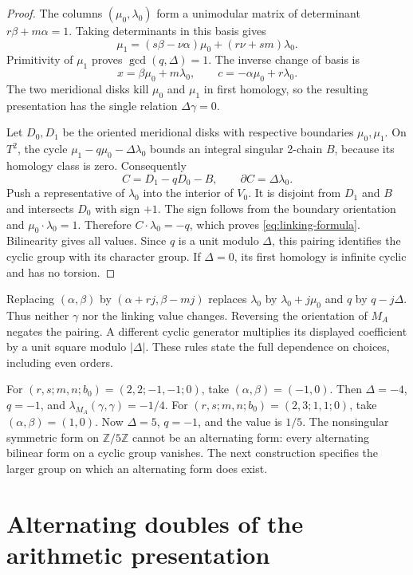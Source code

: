 \documentclass[11pt]{article}
\numberwithin{equation}{section}
\begin{document}
\begin{proof}
The columns $(\mu_0,\lambda_0)$ form a unimodular matrix of determinant
$r\beta+m\alpha=1$.  Taking determinants in this basis gives
\[
 \mu_1=(s\beta-\nu\alpha)\mu_0+(r\nu+sm)\lambda_0.
\]
Primitivity of $\mu_1$ proves $\gcd(q,\Delta)=1$.
The inverse change of basis is
\[
               x=\beta\mu_0+m\lambda_0,\qquad
               c=-\alpha\mu_0+r\lambda_0.
\]
The two meridional disks kill $\mu_0$ and $\mu_1$ in first homology,
so the resulting presentation has the single relation $\Delta\gamma=0$.

Let $D_0,D_1$ be the oriented meridional disks with respective
boundaries $\mu_0,\mu_1$.  On $T^2$, the cycle
$\mu_1-q\mu_0-\Delta\lambda_0$ bounds an integral singular
2-chain $B$, because its homology class is zero.  Consequently
\[
                   C=D_1-qD_0-B,\qquad
                   \partial C=\Delta\lambda_0.
\]
Push a representative of $\lambda_0$ into the interior of $V_0$.
It is disjoint from $D_1$ and $B$ and intersects $D_0$ with sign $+1$.
The sign follows from the boundary orientation and
$\mu_0\cdot\lambda_0=1$.  Therefore $C\cdot\lambda_0=-q$,
which proves \eqref{eq:linking-formula}.  Bilinearity gives all values.
Since $q$ is a unit modulo $\Delta$, this pairing identifies the cyclic
group with its character group.  If $\Delta=0$, its first homology
is infinite cyclic and has no torsion.
\end{proof}

Replacing $(\alpha,\beta)$ by $(\alpha+rj,\beta-mj)$ replaces
$\lambda_0$ by $\lambda_0+j\mu_0$ and $q$ by $q-j\Delta$.
Thus neither $\gamma$ nor the linking value changes.
Reversing the orientation of $M_A$ negates the pairing.
A different cyclic generator multiplies its displayed coefficient by a
unit square modulo $|\Delta|$.
These rules state the full dependence on choices, including even orders.

For $(r,s;m,n;b_0)=(2,2;-1,-1;0)$, take
$(\alpha,\beta)=(-1,0)$.  Then $\Delta=-4$, $q=-1$, and
$\lambda_{M_A}(\gamma,\gamma)=-1/4$.
For $(r,s;m,n;b_0)=(2,3;1,1;0)$, take $(\alpha,\beta)=(1,0)$.
Now $\Delta=5$, $q=-1$, and the value is $1/5$.
The nonsingular symmetric form on $\mathbb Z/5\mathbb Z$ cannot
be an alternating form: every alternating bilinear form on a cyclic
group vanishes.  The next construction specifies the larger group
on which an alternating form does exist.

\section{Alternating doubles of the arithmetic presentation}
\end{document}
